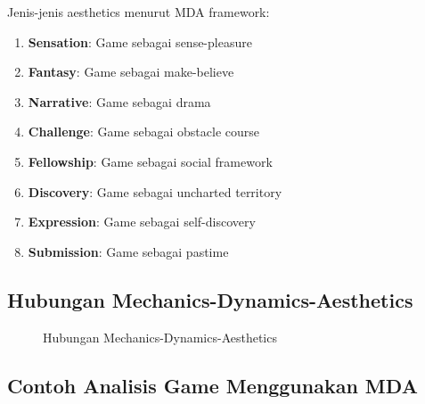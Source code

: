 Jenis-jenis aesthetics menurut MDA framework:
\begin{enumerate}
\item \textbf{Sensation}: Game sebagai sense-pleasure
\item \textbf{Fantasy}: Game sebagai make-believe
\item \textbf{Narrative}: Game sebagai drama
\item \textbf{Challenge}: Game sebagai obstacle course
\item \textbf{Fellowship}: Game sebagai social framework
\item \textbf{Discovery}: Game sebagai uncharted territory
\item \textbf{Expression}: Game sebagai self-discovery
\item \textbf{Submission}: Game sebagai pastime
\end{enumerate}

\subsection{Hubungan Mechanics-Dynamics-Aesthetics}

\begin{figure}[h]
\centering
{}
\caption{Hubungan Mechanics-Dynamics-Aesthetics}
\label{fig:mda_relationship}
\end{figure}

\subsection{Contoh Analisis Game Menggunakan MDA}

